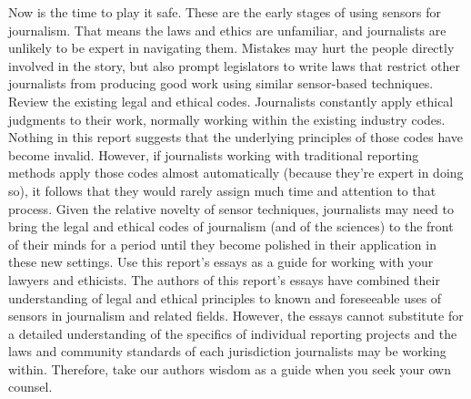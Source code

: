 \begin{itemize}
Now is the time to play it safe.
These are the early stages of using sensors for journalism. That means the
laws and ethics are unfamiliar, and journalists are unlikely to be expert in
navigating them. Mistakes may hurt the people directly involved in the
story, but also prompt legislators to write laws that restrict other journalists
from producing good work using similar sensor-based techniques.
Review the existing legal and ethical codes.
Journalists constantly apply ethical judgments to their work, normally working
within the existing industry codes. Nothing in this report suggests that
the underlying principles of those codes have become invalid. However, if
journalists working with traditional reporting methods apply those codes
almost automatically (because they're expert in doing so), it follows that
they would rarely assign much time and attention to that process. Given
the relative novelty of sensor techniques, journalists may need to bring the
legal and ethical codes of journalism (and of the sciences) to the front of
their minds for a period until they become polished in their application in
these new settings.
Use this report's essays as a guide for working with your
lawyers and ethicists.
The authors of this report's essays have combined their understanding of
legal and ethical principles to known and foreseeable uses of sensors in
journalism and related fields. However, the essays cannot substitute for a
detailed understanding of the specifics of individual reporting projects and
the laws and community standards of each jurisdiction journalists may be
working within. Therefore, take our authors wisdom as a guide when you
seek your own counsel.



\end{itemize}
